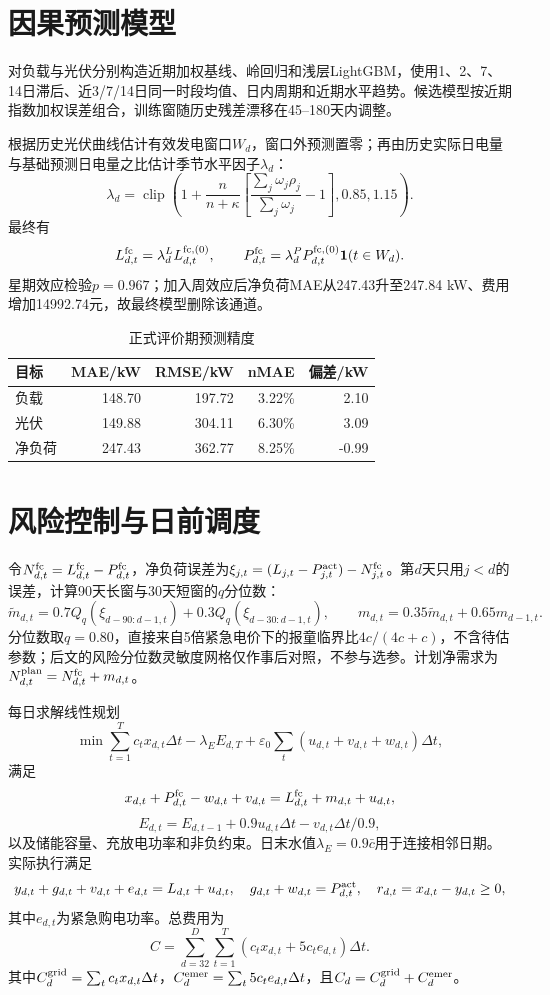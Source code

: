 \documentclass[UTF8,12pt]{ctexart}
\begin{document}
\section{因果预测模型}
对负载与光伏分别构造近期加权基线、岭回归和浅层LightGBM，使用1、2、7、14日滞后、近3/7/14日同一时段均值、日内周期和近期水平趋势。候选模型按近期指数加权误差组合，训练窗随历史残差漂移在45--180天内调整。

根据历史光伏曲线估计有效发电窗口$W_d$，窗口外预测置零；再由历史实际日电量与基础预测日电量之比估计季节水平因子$\lambda_d$：
\[
\lambda_d=\operatorname{clip}\left(1+\frac{n}{n+\kappa}
\left[\frac{\sum_j\omega_j\rho_j}{\sum_j\omega_j}-1\right],0.85,1.15\right).
\]
最终有
\[
L_{d,t}^{\rm fc}=\lambda_d^L L_{d,t}^{\rm fc,(0)},\qquad
P_{d,t}^{\rm fc}=\lambda_d^P P_{d,t}^{\rm fc,(0)}\mathbf1(t\in W_d).
\]
星期效应检验$p=0.967$；加入周效应后净负荷MAE从247.43升至247.84 kW、费用增加14992.74元，故最终模型删除该通道。

\begin{table}[H]\centering
\caption{正式评价期预测精度}
\begin{tabular}{lrrrr}\toprule
目标 & MAE/kW & RMSE/kW & nMAE & 偏差/kW\\\midrule
负载 & 148.70 & 197.72 & 3.22\% & 2.10\\
光伏 & 149.88 & 304.11 & 6.30\% & 3.09\\
净负荷 & 247.43 & 362.77 & 8.25\% & -0.99\\\bottomrule
\end{tabular}
\end{table}

\section{风险控制与日前调度}
令$N_{d,t}^{\rm fc}=L_{d,t}^{\rm fc}-P_{d,t}^{\rm fc}$，净负荷误差为$\xi_{j,t}=(L_{j,t}-P_{j,t}^{\rm act})-N_{j,t}^{\rm fc}$。第$d$天只用$j<d$的误差，计算90天长窗与30天短窗的$q$分位数：
\[
\widetilde m_{d,t}=0.7Q_q(\xi_{d-90:d-1,t})+0.3Q_q(\xi_{d-30:d-1,t}),\qquad
m_{d,t}=0.35\widetilde m_{d,t}+0.65m_{d-1,t}.
\]
分位数取$q=0.80$，直接来自5倍紧急电价下的报童临界比$4c/(4c+c)$，不含待估参数；后文的风险分位数灵敏度网格仅作事后对照，不参与选参。计划净需求为$N_{d,t}^{\rm plan}=N_{d,t}^{\rm fc}+m_{d,t}$。

每日求解线性规划
\[
\min \sum_{t=1}^{T}c_tx_{d,t}\Delta t-\lambda_EE_{d,T}
+\varepsilon_0\sum_t(u_{d,t}+v_{d,t}+w_{d,t})\Delta t,
\]
满足
\[
x_{d,t}+P_{d,t}^{\rm fc}-w_{d,t}+v_{d,t}
=L_{d,t}^{\rm fc}+m_{d,t}+u_{d,t},
\]
\[
E_{d,t}=E_{d,t-1}+0.9u_{d,t}\Delta t-v_{d,t}\Delta t/0.9,
\]
以及储能容量、充放电功率和非负约束。日末水值$\lambda_E=0.9\bar c$用于连接相邻日期。实际执行满足
\[
y_{d,t}+g_{d,t}+v_{d,t}+e_{d,t}=L_{d,t}+u_{d,t},\quad
g_{d,t}+w_{d,t}=P_{d,t}^{\rm act},\quad
r_{d,t}=x_{d,t}-y_{d,t}\ge0,
\]
其中$e_{d,t}$为紧急购电功率。总费用为
\[
C=\sum_{d=32}^{D}\sum_{t=1}^{T}(c_tx_{d,t}+5c_te_{d,t})\Delta t.
\]
其中$C_d^{\rm grid}=\sum_t c_tx_{d,t}\Delta t$，$C_d^{\rm emer}=\sum_t5c_te_{d,t}\Delta t$，且$C_d=C_d^{\rm grid}+C_d^{\rm emer}$。
\end{document}
